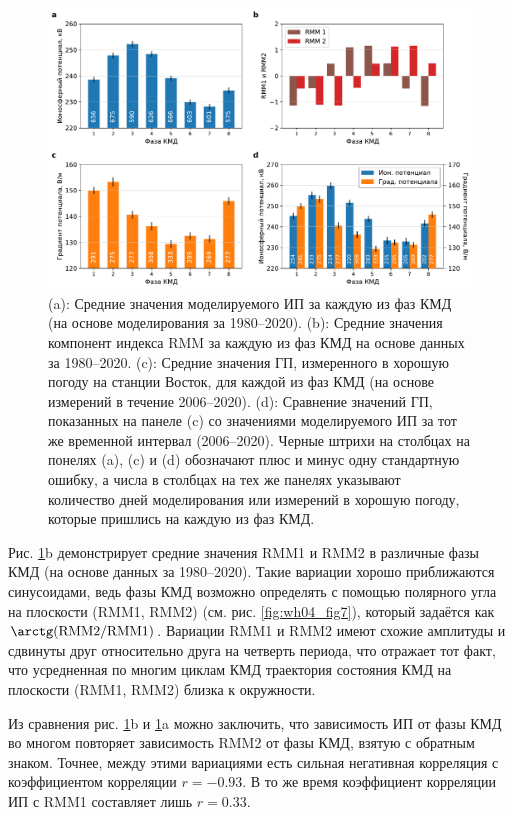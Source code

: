 \begin{figure} 
    \centering
    \includegraphics[width=\textwidth]{figures/variations.pdf}
    \caption{(a): Средние значения моделируемого ИП за каждую из фаз КМД (на основе моделирования за 1980--2020). (b): Средние значения компонент индекса RMM за каждую из фаз КМД на основе данных за 1980--2020. (c): Средние значения ГП, измеренного в хорошую погоду на станции Восток, для каждой из фаз КМД (на основе измерений в течение 2006--2020). (d): Сравнение значений ГП, показанных на панеле (c) со значениями моделируемого ИП за тот же временной интервал (2006--2020). Черные штрихи на столбцах на понелях (a), (c) и (d) обозначают плюс и минус одну стандартную ошибку, а числа в столбцах на тех же панелях указывают количество дней моделирования или измерений в хорошую погоду, которые пришлись на каждую из фаз КМД.}
    \label{fig:variations}
\end{figure}

Рис. \ref{fig:variations}{b} демонстрирует средние значения RMM1 и RMM2 в различные фазы КМД (на основе данных за 1980--2020). Такие вариации хорошо приближаются синусоидами, ведь фазы КМД возможно определять с помощью полярного угла на плоскости (RMM1, RMM2) (см. рис. \ref{fig:wh04_fig7}), который задаётся как $\arctg(\mathrm{RMM2}/\mathrm{RMM1})$. Вариации RMM1 и RMM2 имеют схожие амплитуды и сдвинуты друг относительно друга на четверть периода, что отражает тот факт, что усредненная по многим циклам КМД траектория состояния КМД на плоскости (RMM1, RMM2) близка к окружности.

Из сравнения рис. \ref{fig:variations}{b} и \ref{fig:variations}{a} можно заключить, что зависимость ИП от фазы КМД во многом повторяет зависимость RMM2 от фазы КМД, взятую с обратным знаком. Точнее, между этими вариациями есть сильная негативная корреляция с коэффициентом корреляции $r=-0.93$. В то же время коэффициент корреляции ИП с RMM1 составляет лишь $r=0.33$.

